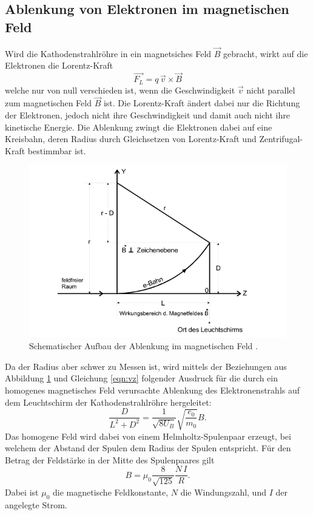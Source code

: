 \subsection{Ablenkung von Elektronen im magnetischen Feld}
\label{sec:bfeld}
Wird die Kathodenstrahlröhre in ein magnetsiches Feld $\vec{B}$ gebracht, wirkt auf die Elektronen die Lorentz-Kraft
\begin{equation}
  \vec{F_L} =  q \, \vec{v} \times \vec{B}
  \label{eqn:Lorentz}
\end{equation}
welche nur von null verschieden ist, wenn die Geschwindigkeit $\vec{v}$ nicht parallel zum magnetischen Feld $\vec{B}$ ist.
Die Lorentz-Kraft ändert dabei nur die Richtung der Elektronen, jedoch nicht ihre Geschwindigkeit und damit auch nicht ihre kinetische Energie.
Die Ablenkung zwingt die Elektronen dabei auf eine Kreisbahn, deren Radius durch Gleichsetzen von Lorentz-Kraft und Zentrifugal-Kraft bestimmbar ist.
\begin{figure}
  \centering
  \includegraphics{images/bfeld.png}
  \caption{Schematischer Aufbau der Ablenkung im magnetischen Feld \cite{502}.}
  \label{fig:bfeld}
\end{figure}
Da der Radius aber schwer zu Messen ist, wird mittels der Beziehungen aus Abbildung \ref{fig:bfeld} und Gleichung \eqref{eqn:vz} folgender Ausdruck für die durch ein homogenes magnetisches Feld verursachte
Ablenkung des Elektronenstrahls auf dem Leuchtschirm der Kathodenstrahlröhre hergeleitet:
\begin{equation}
  \frac{D}{L^2 + D^2} = \frac{1}{\sqrt{8 U_B}} \sqrt{\frac{e_0}{m_0}} B .
  \label{eqn:AblenkungBFeld}
\end{equation}
Das homogene Feld wird dabei von einem Helmholtz-Spulenpaar erzeugt, bei welchem der Abstand der Spulen dem Radius der Spulen entspricht.
Für den Betrag der Feldstärke in der Mitte des Spulenpaares gilt
\begin{equation}
  B = {\mu}_0 \frac{8}{\sqrt{125}} \frac{N \, I}{R} .
  \label{eqn:helmholtz}
\end{equation}
Dabei ist ${\mu}_0$ die magnetische Feldkonstante, $N$ die Windungszahl, und $I$ der angelegte Strom.
